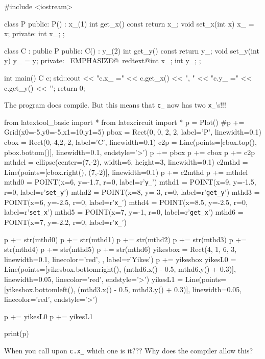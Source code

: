 \begin{console}[commandchars=\~\@\$]
#include <iostream>

class P
{
public:
        P() : x_(1) {}
        int get_x() const { return x_; }
        void set_x(int x) { x_ = x; }
private:
        int x_;
};

class C : public P
{
public:
        C() : y_(2) {}
        int get_y() const { return y_; }
        void set_y(int y) { y_ = y; }
private:
        ~EMPHASIZE@~redtext@int x_;$$
        int y_;
};

int main()
{   
    C c;
    std::cout << "c.x_ =" << c.get_x() << ", "
              << "c.y_ =" << c.get_y() << '\n';
    return 0;
}
\end{console}

The program does compile. But this means that \verb!c_! now has two
\verb!x_!'s!!!
\begin{python}
from latextool_basic import *
from latexcircuit import *
p = Plot()
#p += Grid(x0=-5,y0=-5,x1=10,y1=5)
pbox = Rect(0, 0, 2, 2, label='P', linewidth=0.1)
cbox = Rect(0,-4,2,-2, label='C', linewidth=0.1)
c2p = Line(points=[cbox.top(), pbox.bottom()], linewidth=0.1, endstyle='>')
p += pbox
p += cbox
p += c2p
mthdel = ellipse(center=(7,-2), width=6, height=3, linewidth=0.1)
c2mthd = Line(points=[cbox.right(), (7,-2)], linewidth=0.1)
p += c2mthd
p += mthdel
mthd0 = POINT(x=6, y=-1.7, r=0, label=r'\verb!y_!')
mthd1 = POINT(x=9, y=-1.5, r=0, label=r'\verb!set_y!')
mthd2 = POINT(x=8, y=-3, r=0, label=r'\verb!get_y!')
mthd3 = POINT(x=6, y=-2.5, r=0, label=r'\verb!x_!')
mthd4 = POINT(x=8.5, y=-2.5, r=0, label=r'\verb!set_x!')
mthd5 = POINT(x=7, y=-1, r=0, label=r'\verb!get_x!')
mthd6 = POINT(x=7, y=-2.2, r=0, label=r'\verb!x_!')

p += str(mthd0)
p += str(mthd1)
p += str(mthd2)
p += str(mthd3)
p += str(mthd4)
p += str(mthd5)
p += str(mthd6)
yikesbox = Rect(4, 1, 6, 3, linewidth=0.1, linecolor='red', , label=r'Yikes')
p += yikesbox
yikesL0 = Line(points=[yikesbox.bottomright(), (mthd6.x() - 0.5, mthd6.y() + 0.3)], linewidth=0.05, linecolor='red', endstyle='>')
yikesL1 = Line(points=[yikesbox.bottomleft(), (mthd3.x() - 0.5, mthd3.y() + 0.3)], linewidth=0.05, linecolor='red', endstyle='>')

p += yikesL0
p += yikesL1

print(p)
\end{python}
When you call upon \verb!c.x_! which one is it??? Why does the compiler
allow this?

